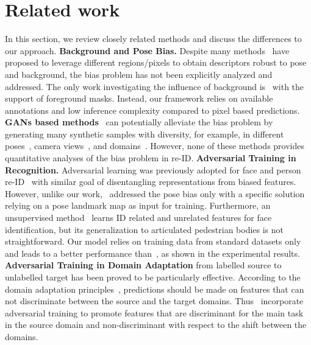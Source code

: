 \documentclass[10pt,twocolumn,letterpaper]{article}
\begin{document}
\section{Related work}
In this section, we review closely related methods and discuss the differences to our approach. 
\newline
\noindent\textbf{Background and Pose Bias.}
Despite many methods~\cite{li2017learning,zhao2017spindle,su2017pose,song2018mask} have proposed to leverage different regions/pixels to obtain descriptors robust to pose and background, the bias problem has not been explicitly analyzed and addressed. 
The only work investigating the influence of background is~\cite{tian2018eliminating} with the support of foreground masks. Instead, our framework relies on available annotations and low inference complexity compared to pixel based predictions. \newline
 \noindent\textbf{GANs based methods}~\cite{zheng2017unlabeled,su2017pose,liu2018pose,zhong2017camera,wei2018person,deng2018image} can potentially alleviate the bias problem by generating many synthetic samples with diversity, for example, in different poses~\cite{su2017pose,liu2018pose}, camera views~\cite{zhong2017camera}, and domains~\cite{wei2018person,deng2018image}. 
However, none of these methods provides quantitative analyses of the bias problem in re-ID. \newline
 \noindent\textbf{Adversarial Training in Recognition.}
 Adversarial learning was previously adopted for face and person re-ID~\cite{liu2018exploring,ge2018fd} with similar goal of disentangling representations from biased features. 
However, unlike our work,~\cite{ge2018fd} addressed the pose bias only with a specific solution relying on a pose landmark map as input for training. Furthermore, an unsupervised method~\cite{liu2018exploring} learns ID related and unrelated features for face identification, but its generalization to articulated pedestrian bodies is not straightforward. Our model relies on training data from standard datasets only and leads to a better performance than~\cite{liu2018exploring}, as shown in the experimental results. 
\newline
\noindent\textbf{Adversarial Training in Domain Adaptation} from labelled source to unlabelled target has been proved to be particularly effective.  According to the domain adaptation principles~\cite{ben2007analysis}, predictions should be made on features that can not discriminate between the source and the target domains. Thus~\cite{ganin2014unsupervised,ganin2016domain,tzeng2017adversarial} incorporate adversarial training to promote features that are discriminant for the main task in the source domain and non-discriminant with respect to the shift between the domains.
\end{document}

